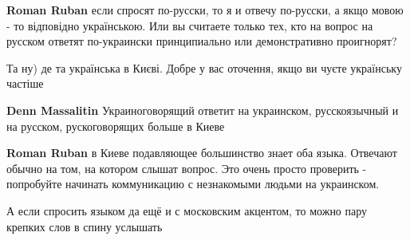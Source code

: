 \begin{itemize}
\begin{itemize}
 
\textbf{Roman Ruban} если спросят по-русски, то я и отвечу по-русски, а якщо мовою - то відповідно українською. Или вы считаете только тех, кто на вопрос на русском ответят по-украински принципиально или демонстративно проигнорят?

 
Та ну) де та українська в Києві. Добре у вас оточення, якщо ви чуєте українську частіше

 
\textbf{Denn Massalitin} Украиноговорящий ответит на украинском, русскоязычный и на русском, рускоговорящих больше в Киеве

 
\textbf{Roman Ruban} в Киеве подавляющее большинство знает оба языка. Отвечают обычно на том, на котором слышат вопрос. Это очень просто проверить - попробуйте начинать коммуникацию с незнакомыми людьми на украинском.

 
А если спросить языком да ещё и с московским акцентом, то можно пару крепких слов в спину услышать \Laughey[1.0][white]
\end{itemize}

 


\end{itemize}
